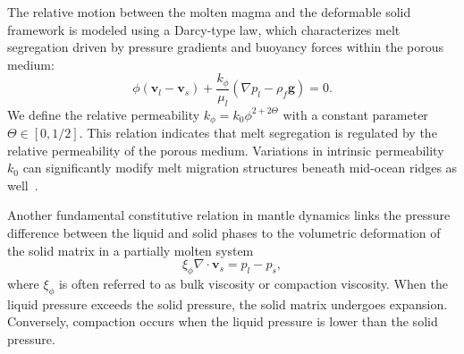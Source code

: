 The relative motion between the molten magma and the deformable solid framework is modeled using 
a Darcy-type law, which characterizes melt segregation driven by pressure gradients and buoyancy 
forces within the porous medium:
\begin{equation}
		  \label{eq:darcy}
		  \phi (\mathbf{v}_l - \mathbf{v}_s)
		  + \frac{k_{\phi}}{\mu_l}(\nabla p_l - \rho_f\mathbf{g})
	    = 0.
\end{equation}
We define the relative permeability 
$k_{\phi} = k_0 \phi^{2+2\Theta}$ with a constant parameter
$\Theta \in [0,1/2]$. 
This relation indicates that melt segregation is regulated by the relative permeability 
of the porous medium.
Variations in intrinsic permeability $k_0$ can significantly modify melt migration structures 
beneath mid-ocean ridges as well~\cite{SIM2020106486}.

Another fundamental constitutive relation in mantle dynamics links the pressure difference 
between the liquid and solid phases to the volumetric deformation of the solid matrix
in a partially molten system~\cite{MagmaPhysics}%
\begin{equation}\label{eq:compactionviscosity}
		  \xi_{\phi}\nabla \cdot \mathbf{v}_s  =p_l - p_s, 
\end{equation}
where $\xi_{\phi}$ is often referred to as bulk viscosity or compaction viscosity. 
When the liquid pressure exceeds the solid pressure, the solid matrix undergoes expansion.
Conversely, compaction occurs when the liquid pressure is lower than the solid pressure.

